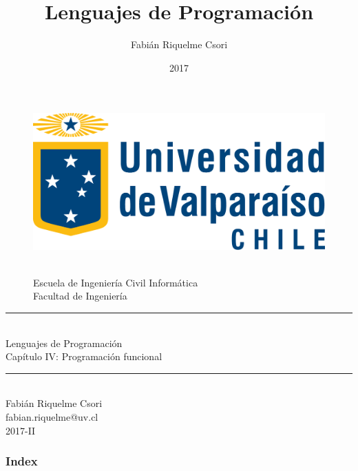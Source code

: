 \documentclass{beamer} %
\title{Lenguajes de Programación}                     %
\author{Fabián Riquelme Csori}                        %
\date{2017}                                           %
\institute{Universidad de Valparaíso}                 %
\newcommand{\HRule}{\rule{\linewidth}{0.2mm}\\[1ex]}
\begin{document}
%

\begin{frame}[plain]
  \begin{figure}[h]
    \begin{minipage}{0.3\textwidth}
    \includegraphics[width=.9\textwidth]{./image/logo-UV.png}
    \end{minipage}
    \begin{minipage}{0.65\textwidth}
     $~$\\[3.6ex]
     \footnotesize{Escuela de Ingeniería Civil Informática}\\
     \footnotesize{Facultad de Ingeniería}
    \end{minipage}
  \end{figure}
  \begin{center}
    \vspace{1ex}
    \HRule
    \Large{Lenguajes de Programación}\\{\small Capítulo IV: Programación funcional}\\[-1ex]
    \HRule\vspace{1ex}
    \large{Fabián Riquelme Csori}\\[.5ex]\footnotesize{fabian.riquelme@uv.cl}\\[6ex] {\tiny 2017-II}\\[6ex]
  \end{center}
\end{frame}

\begin{frame}
 \frametitle{Index}
 \scriptsize 			%
 \tableofcontents		%
\end{frame}
\end{document}

